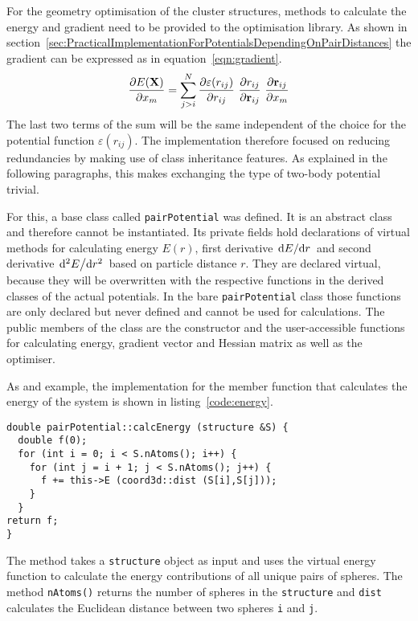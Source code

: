 For the geometry optimisation of the cluster structures, methods to calculate the
energy and gradient need to be provided to the optimisation library. As shown in
section~\ref{sec:PracticalImplementationForPotentialsDependingOnPairDistances}
the gradient can be expressed as in equation~\eqref{eqn:gradient}.
%
\begin{align}
    \pdv{E(\mathbf{X})}{x_m}=\sum_{j>i}^N\pdv{\varepsilon(r_{ij})}{r_{ij}}\ \pdv{r_{ij}}{\mathbf{r}_{ij}}\ \pdv{\mathbf{r}_{ij}}{x_m}\label{eqn:gradient}
\end{align}
%
The last two terms of the sum will be the same independent of the choice for the
potential function $\varepsilon(r_{ij})$. The implementation therefore 
focused on reducing redundancies by making use of class inheritance features. As
explained in the following paragraphs, this makes exchanging the type of
two-body potential trivial.

For this, a base class called \verb|pairPotential| was defined. It is an
abstract class and therefore cannot be instantiated. Its private fields hold
declarations of virtual methods for calculating energy $E(r)$, first derivative
$\dv*{E}{r}$ and second derivative $\dv*[2]{E}{r}$ based on particle distance
$r$. They are declared virtual, because they will be overwritten with the
respective functions in the derived classes of the actual potentials. In the
bare \verb|pairPotential| class those functions are only declared but never
defined and cannot be used for calculations. The public members of the class are
the constructor and the user-accessible functions for calculating energy,
gradient vector and Hessian matrix as well as the optimiser.

As and example, the \Cpp implementation for the member function that calculates
the energy of the system is shown in listing~\ref{code:energy}.
%
\begin{lstlisting}[caption={Implementation of the redundant part of the energy calculation.},label=code:energy,float=htb]
double pairPotential::calcEnergy (structure &S) {
  double f(0);
  for (int i = 0; i < S.nAtoms(); i++) {
    for (int j = i + 1; j < S.nAtoms(); j++) {
      f += this->E (coord3d::dist (S[i],S[j]));
    }
  }
return f;
}
\end{lstlisting}
%
The method takes a \verb|structure| object as input and uses the virtual energy
function to calculate the energy contributions of all unique pairs of spheres.
The method \texttt{nAtoms()} returns the number of spheres in the
\texttt{structure} and \texttt{dist} calculates the Euclidean distance between
two spheres \texttt{i} and \texttt{j}.

